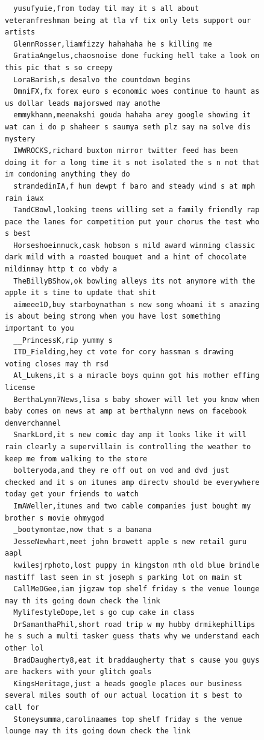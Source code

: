 \begin{figure}[htpb]
\begin{verbatim}
  yusufyuie,from today til may it s all about veteranfreshman being at tla vf tix only lets support our artists
  GlennRosser,liamfizzy hahahaha he s killing me
  GratiaAngelus,chaosnoise done fucking hell take a look on this pic that s so creepy
  LoraBarish,s desalvo the countdown begins
  OmniFX,fx forex euro s economic woes continue to haunt as us dollar leads majorswed may anothe
  emmykhann,meenakshi gouda hahaha arey google showing it wat can i do p shaheer s saumya seth plz say na solve dis mystery
  IWWROCKS,richard buxton mirror twitter feed has been doing it for a long time it s not isolated the s n not that im condoning anything they do
  strandedinIA,f hum dewpt f baro and steady wind s at mph rain iawx
  TandCBowl,looking teens willing set a family friendly rap pace the lanes for competition put your chorus the test who s best
  Horseshoeinnuck,cask hobson s mild award winning classic dark mild with a roasted bouquet and a hint of chocolate mildinmay http t co vbdy a
  TheBillyBShow,ok bowling alleys its not anymore with the apple it s time to update that shit
  aimeee1D,buy starboynathan s new song whoami it s amazing is about being strong when you have lost something important to you
  __PrincessK,rip yummy s
  ITD_Fielding,hey ct vote for cory hassman s drawing voting closes may th rsd
  Al_Lukens,it s a miracle boys quinn got his mother effing license
  BerthaLynn7News,lisa s baby shower will let you know when baby comes on news at amp at berthalynn news on facebook denverchannel
  SnarkLord,it s new comic day amp it looks like it will rain clearly a supervillain is controlling the weather to keep me from walking to the store
  bolteryoda,and they re off out on vod and dvd just checked and it s on itunes amp directv should be everywhere today get your friends to watch
  ImAWeller,itunes and two cable companies just bought my brother s movie ohmygod
  _bootymontae,now that s a banana
  JesseNewhart,meet john browett apple s new retail guru aapl
  kwilesjrphoto,lost puppy in kingston mth old blue brindle mastiff last seen in st joseph s parking lot on main st
  CallMeDGee,iam jigzaw top shelf friday s the venue lounge may th its going down check the link
  MylifestyleDope,let s go cup cake in class
  DrSamanthaPhil,short road trip w my hubby drmikephillips he s such a multi tasker guess thats why we understand each other lol
  BradDaugherty8,eat it braddaugherty that s cause you guys are hackers with your glitch goals
  KingsHeritage,just a heads google places our business several miles south of our actual location it s best to call for
  Stoneysumma,carolinaames top shelf friday s the venue lounge may th its going down check the link

\end{verbatim}
\end{figure}
